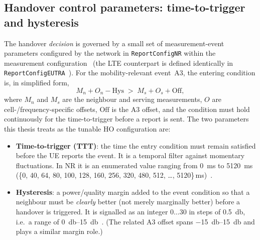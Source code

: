 \subsection{Handover control parameters: time-to-trigger and hysteresis}
\label{subsec:ho-control}

The handover \emph{decision} is governed by a small set of measurement-event
parameters configured by the network in \texttt{ReportConfigNR} within the
measurement configuration~\cite{ts38331} (the LTE counterpart is defined
identically in \texttt{ReportConfigEUTRA}~\cite{ts36331}). For the
mobility-relevant event~A3, the entering condition is, in simplified form,
\[
  M_{n} + O_{n} - \mathrm{Hys} \;>\; M_{s} + O_{s} + \mathrm{Off},
\]
where $M_{n}$ and $M_{s}$ are the neighbour and serving measurements, $O$ are
cell-/frequency-specific offsets, $\mathrm{Off}$ is the A3 offset, and the
condition must hold continuously for the time-to-trigger before a report is
sent. The two parameters this thesis treats as the tunable HO configuration are:

\begin{itemize}
  \item \textbf{Time-to-trigger (TTT)}: the time the entry condition must
  remain satisfied before the UE reports the event. It is a temporal filter
  against momentary fluctuations. In NR it is an enumerated value ranging from
  \SI{0}{\milli\second} to \SI{5120}{\milli\second}
  (\{0, 40, 64, 80, 100, 128, 160, 256, 320, 480, 512, \dots, 5120\}\,ms)~\cite{ts38331}.
  \item \textbf{Hysteresis}: a power/quality margin added to the event
  condition so that a neighbour must be \emph{clearly} better (not merely
  marginally better) before a handover is triggered. It is signalled as an
  integer $0\ldots30$ in steps of \SI{0.5}{\decibel}, i.e.\ a range of
  \SIrange{0}{15}{\decibel}~\cite{ts38331}. (The related A3 offset spans
  \SIrange{-15}{15}{\decibel} and plays a similar margin role.)
\end{itemize}

